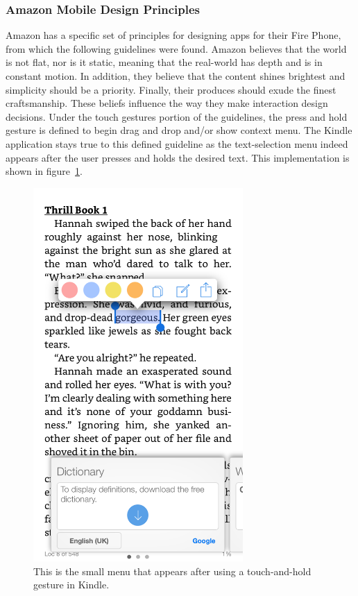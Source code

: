 \documentclass[journal, a4paper]{IEEEtran}
\begin{document}
\subsubsection{Amazon Mobile Design Principles}
	Amazon has a specific set of principles for designing apps for their Fire Phone, from which the following guidelines were found. Amazon believes that the world is not flat, nor is it static, meaning that the real-world has depth and is in constant motion. In addition, they believe that the content shines brightest and simplicity should be a priority. Finally, their produces should exude the finest craftsmanship. These beliefs influence the way they make interaction design decisions.
    Under the touch gestures portion of the guidelines, the press and hold gesture is defined to begin drag and drop and/or show context menu. The Kindle application stays true to this defined guideline as the text-selection menu indeed appears after the user presses and holds the desired text. This implementation is shown in figure~\ref{fig:kindleHighlight}.
    
    \begin{figure}[!hbt]
		\begin{center}
		\includegraphics[width=8cm]{kindleHighlight}
		\caption{This is the small menu that appears after using a touch-and-hold gesture in Kindle.}
		\label{fig:kindleHighlight}
		\end{center}
	\end{figure}
    
\end{document}
